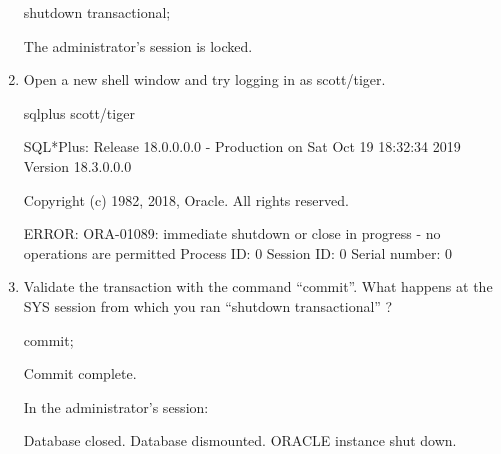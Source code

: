 \documentclass{article}
\begin{document}
\begin{enumerate}
\begin{sqlshell}
shutdown transactional;
\end{sqlshell}
The administrator's session is locked.
  \item Open a new shell window and try logging in as scott/tiger. 
  \begin{commandshell}
sqlplus scott/tiger
\end{commandshell}
\begin{messageshell}

SQL*Plus: Release 18.0.0.0.0 - Production on Sat Oct 19 18:32:34 2019
Version 18.3.0.0.0

Copyright (c) 1982, 2018, Oracle.  All rights reserved.

ERROR:
ORA-01089: immediate shutdown or close in progress - no operations are
permitted
Process ID: 0
Session ID: 0 Serial number: 0


\end{messageshell}
  \item Validate the transaction with the command “commit”. What happens at the SYS session from which you ran “shutdown transactional” ?
  \begin{sqlshell}
commit;

\end{sqlshell}
\begin{messageshell}
Commit complete.

\end{messageshell}
In the administrator's session:
\begin{messageshell}
Database closed.
Database dismounted.
ORACLE instance shut down.

\end{messageshell}
\end{enumerate}
\end{document}
